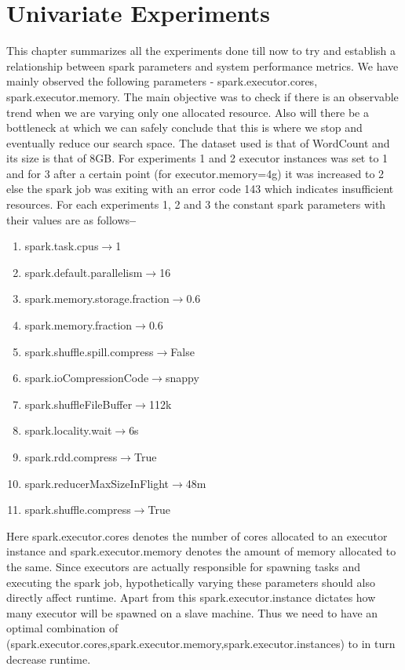\documentclass[11pt]{article}
\begin{document}
\section{Univariate Experiments}
This chapter summarizes all the experiments done till now to try and establish a relationship between spark parameters and system performance metrics. We have mainly observed the following parameters - spark.executor.cores, spark.executor.memory. The main objective was to check if there is an observable trend when we are varying only one allocated resource. Also will there be a bottleneck at which we can safely conclude that this is where we stop and eventually reduce our search space. The dataset used is that of WordCount and its size is that of 8GB. For experiments 1 and 2 executor instances was set to 1 and for 3 after a certain point (for executor.memory=4g) it was increased to 2 else the spark job was exiting with an error code 143 which indicates insufficient resources. 
For each experiments 1, 2 and 3 the constant spark parameters with their values are as follows\textbf{--}
\begin{enumerate}
    \item spark.task.cpus$\rightarrow$1
    \item spark.default.parallelism$\rightarrow$16
    \item spark.memory.storage.fraction$\rightarrow$0.6
    \item spark.memory.fraction$\rightarrow$0.6
    \item spark.shuffle.spill.compress$\rightarrow$False
    \item spark.ioCompressionCode$\rightarrow$snappy
    \item spark.shuffleFileBuffer$\rightarrow$112k
    \item spark.locality.wait$\rightarrow$6s
    \item spark.rdd.compress$\rightarrow$True
    \item spark.reducerMaxSizeInFlight$\rightarrow$48m
    \item spark.shuffle.compress$\rightarrow$True
\end{enumerate}
Here spark.executor.cores denotes the number of cores allocated to an executor instance and
spark.executor.memory denotes the amount of memory allocated to the same. Since executors are actually responsible for spawning tasks and executing the spark job, hypothetically varying these parameters should also directly affect runtime. Apart from this spark.executor.instance dictates how many executor will be spawned on a slave machine. Thus we need to have an optimal combination of (spark.executor.cores,spark.executor.memory,spark.executor.instances) to in turn decrease runtime. 
\end{document}
